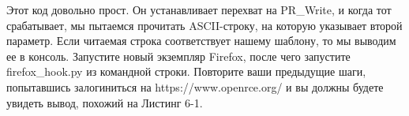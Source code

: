 \documentclass[12pt]{book}
\begin{document}












Этот код довольно прост. Он устанавливает перехват на PR\_Write, и когда тот срабатывает, мы пытаемся прочитать ASCII-строку, на которую указывает второй параметр. Если читаемая строка соответствует нашему шаблону, то мы выводим ее в консоль. Запустите новый экземпляр Firefox, после чего запустите firefox\_hook.py из командной строки. Повторите ваши предыдущие шаги, попытавшись залогиниться на https://www.openrce.org/ и вы должны будете увидеть вывод, похожий на Листинг 6-1.
\end{document}
